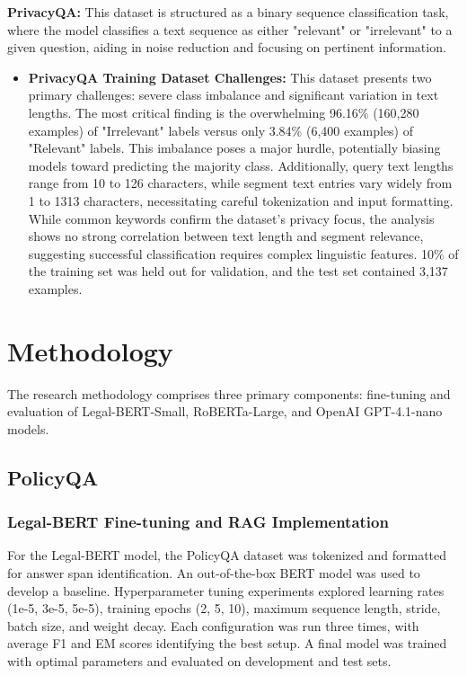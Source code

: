 \documentclass[11pt]{article}
\begin{document}
\textbf{PrivacyQA:} This dataset is structured as a binary sequence classification task, where the model classifies a text sequence as either "relevant" or "irrelevant" to a given question, aiding in noise reduction and focusing on pertinent information.
\begin{itemize}
    \item \textbf{PrivacyQA Training Dataset Challenges:} This dataset presents two primary challenges: severe class imbalance and significant variation in text lengths. The most critical finding is the overwhelming 96.16\% (160,280 examples) of "Irrelevant" labels versus only 3.84\% (6,400 examples) of "Relevant" labels. This imbalance poses a major hurdle, potentially biasing models toward predicting the majority class. Additionally, query text lengths range from 10 to 126 characters, while segment text entries vary widely from 1 to 1313 characters, necessitating careful tokenization and input formatting. While common keywords confirm the dataset's privacy focus, the analysis shows no strong correlation between text length and segment relevance, suggesting successful classification requires complex linguistic features. 10\% of the training set was held out for validation, and the test set contained 3,137 examples.
\end{itemize}

\section{Methodology}

The research methodology comprises three primary components: fine-tuning and evaluation of Legal-BERT-Small, RoBERTa-Large, and OpenAI GPT-4.1-nano models.

\subsection{PolicyQA}

\subsubsection{Legal-BERT Fine-tuning and RAG Implementation}

For the Legal-BERT model, the PolicyQA dataset was tokenized and formatted for answer span identification. An out-of-the-box BERT model was used to develop a baseline. Hyperparameter tuning experiments explored learning rates (1e-5, 3e-5, 5e-5), training epochs (2, 5, 10), maximum sequence length, stride, batch size, and weight decay. Each configuration was run three times, with average F1 and EM scores identifying the best setup. A final model was trained with optimal parameters and evaluated on development and test sets.
\end{document}
